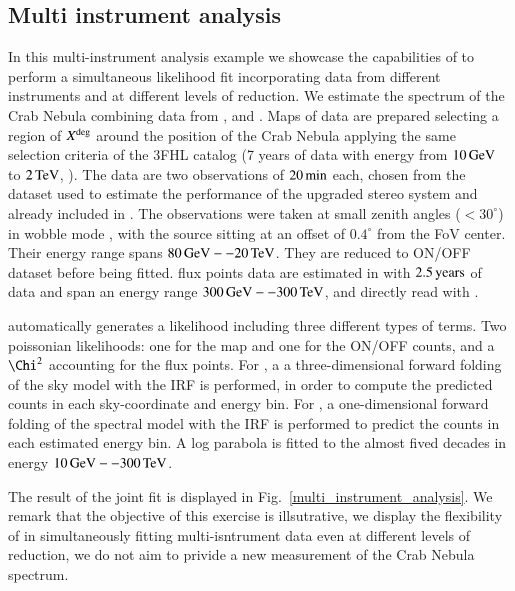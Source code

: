 \subsection{Multi instrument analysis}
\label{ssec:multi-instrument-analysis}

\begin{figure*}[t]
	\sidecaption
	\texttt{[image: figures/multi\_instrument\_analysis.pdf]}
	\caption{A multi-instrument analysis of the Crab Nebula}
	multi_instrument_analysismulti_instrument_analysis}
\end{figure*}


In this multi-instrument analysis example we showcase the capabilities of \gammapy
to perform a simultaneous likelihood fit incorporating data from different instruments
and at different levels of reduction.
We estimate the spectrum of the Crab Nebula combining data from \fermi, \magic and \hawc.
Maps of \fermi data are prepared selecting a region of $X^{\rm deg}$ around the
position of the Crab Nebula applying the same selection criteria of the 3FHL
catalog (7 years of data with energy from $10\,{\rm GeV}$ to $2\,{\rm TeV}$, ).
The \MAGIC data are two observations of $20\,{\rm min}$ each, chosen from the
dataset used to estimate the performance of the upgraded stereo system \citep{magic_performance}
and already included in \cite{joint_crab}. The observations were taken at small
zenith angles ($<30^{\circ}$) in wobble mode \citep{fomin_1994}, with the source
sitting at an offset of $0.4^{\circ}$ from the FoV center. Their energy range spans
$80\,{\rm GeV} -- 20\,{\rm TeV}$. They are reduced to ON/OFF dataset before being fitted.
\hawc flux points data are estimated in \cite{hawc_crab_2019} with $2.5\,{\rm years}$
of data and span an energy range $300\,{\rm GeV} -- 300\,{\rm TeV}$, and directly read with \gammapy.

\gammapy automatically generates a likelihood including three different types of
terms. Two poissonian likelihoods: one for the \fermi map and one for the ON/OFF
counts, and a $\Chi^2$ accounting for the flux points. For \fermi, a
a three-dimensional forward folding of the sky model with the IRF is performed,
in order to compute the predicted counts in each sky-coordinate and energy bin.
For \magic, a one-dimensional forward folding of the spectral model with the IRF
is performed to predict the counts in each estimated energy bin.
A log parabola is fitted to the almost fived decades in energy $10\,{\rm GeV} -- 300\,{\rm TeV}$.

The result of the joint fit is displayed in Fig.~\ref{multi_instrument_analysis}.
We remark that the objective of this exercise is illsutrative, we display the
flexibility of \gammapy in simultaneously fitting multi-isntrument data even at
different levels of reduction, we do not aim to privide a new measurement of the
Crab Nebula spectrum.

